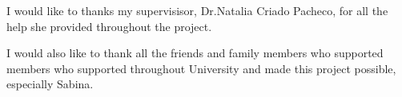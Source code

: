 I would like to thanks my supervisisor, Dr.Natalia Criado Pacheco,
for all the help she provided throughout the project.

I would also like to thank all the friends and
family members who supported members who supported throughout
University and made this project possible, especially Sabina.
